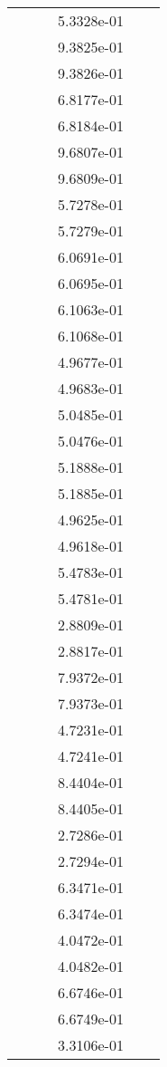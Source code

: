 \begin{xltabular}{\textwidth}{r|rS[table-format=1.3e+2]S[table-format=1.4e+2]S[table-format=1.4e+2]S[table-format=-1.5]}
&  &  & 5.3328e-01 & & \\
&  &  & 9.3825e-01 & & \\
&  &  & 9.3826e-01 & & \\
&  &  & 6.8177e-01 & & \\
&  &  & 6.8184e-01 & & \\
&  &  & 9.6807e-01 & & \\
&  &  & 9.6809e-01 & & \\
&  &  & 5.7278e-01 & & \\
&  &  & 5.7279e-01 & & \\
&  &  & 6.0691e-01 & & \\
&  &  & 6.0695e-01 & & \\
&  &  & 6.1063e-01 & & \\
&  &  & 6.1068e-01 & & \\
&  &  & 4.9677e-01 & & \\
&  &  & 4.9683e-01 & & \\
&  &  & 5.0485e-01 & & \\
&  &  & 5.0476e-01 & & \\
&  &  & 5.1888e-01 & & \\
&  &  & 5.1885e-01 & & \\
&  &  & 4.9625e-01 & & \\
&  &  & 4.9618e-01 & & \\
&  &  & 5.4783e-01 & & \\
&  &  & 5.4781e-01 & & \\
&  &  & 2.8809e-01 & & \\
&  &  & 2.8817e-01 & & \\
&  &  & 7.9372e-01 & & \\
&  &  & 7.9373e-01 & & \\
&  &  & 4.7231e-01 & & \\
&  &  & 4.7241e-01 & & \\
&  &  & 8.4404e-01 & & \\
&  &  & 8.4405e-01 & & \\
&  &  & 2.7286e-01 & & \\
&  &  & 2.7294e-01 & & \\
&  &  & 6.3471e-01 & & \\
&  &  & 6.3474e-01 & & \\
&  &  & 4.0472e-01 & & \\
&  &  & 4.0482e-01 & & \\
&  &  & 6.6746e-01 & & \\
&  &  & 6.6749e-01 & & \\
&  &  & 3.3106e-01 & & \\

\end{xltabular}
